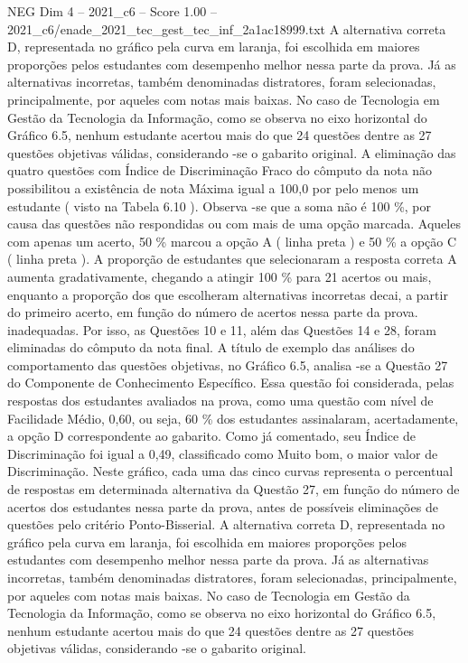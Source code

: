 \begin{textsample}{NEG Dim 4 – 2021\_c6 – Score 1.00 – 2021\_c6/enade\_2021\_tec\_gest\_tec\_inf\_2a1ac18999.txt}
A alternativa correta D, representada no gráfico pela curva em laranja, foi escolhida em maiores proporções pelos estudantes com desempenho melhor nessa parte da prova.
Já as alternativas incorretas, também denominadas distratores, foram selecionadas, principalmente, por aqueles com notas mais baixas.
No caso de Tecnologia em Gestão da Tecnologia da Informação, como se observa no eixo horizontal do Gráfico 6.5, nenhum estudante acertou mais do que 24 questões dentre as 27 questões objetivas válidas, considerando -se o gabarito original.
A eliminação das quatro questões com Índice de Discriminação Fraco do cômputo da nota não possibilitou a existência de nota Máxima igual a 100,0 por pelo menos um estudante ( visto na Tabela 6.10 ).
Observa -se que a soma não é 100 \%, por causa das questões não respondidas ou com mais de uma opção marcada.
Aqueles com apenas um acerto, 50 \% marcou a opção A ( linha preta ) e 50 \% a opção C ( linha preta ).
A proporção de estudantes que selecionaram a resposta correta A aumenta gradativamente, chegando a atingir 100 \% para 21 acertos ou mais, enquanto a proporção dos que escolheram alternativas incorretas decai, a partir do primeiro acerto, em função do número de acertos nessa parte da prova. inadequadas.
Por isso, as Questões 10 e 11, além das Questões 14 e 28, foram eliminadas do cômputo da nota final.
A título de exemplo das análises do comportamento das questões objetivas, no Gráfico 6.5, analisa -se a Questão 27 do Componente de Conhecimento Específico.
Essa questão foi considerada, pelas respostas dos estudantes avaliados na prova, como uma questão com nível de Facilidade Médio, 0,60, ou seja, 60 \% dos estudantes assinalaram, acertadamente, a opção D correspondente ao gabarito.
Como já comentado, seu Índice de Discriminação foi igual a 0,49, classificado como Muito bom, o maior valor de Discriminação.
Neste gráfico, cada uma das cinco curvas representa o percentual de respostas em determinada alternativa da Questão 27, em função do número de acertos dos estudantes nessa parte da prova, antes de possíveis eliminações de questões pelo critério Ponto-Bisserial.
A alternativa correta D, representada no gráfico pela curva em laranja, foi escolhida em maiores proporções pelos estudantes com desempenho melhor nessa parte da prova.
Já as alternativas incorretas, também denominadas distratores, foram selecionadas, principalmente, por aqueles com notas mais baixas.
No caso de Tecnologia em Gestão da Tecnologia da Informação, como se observa no eixo horizontal do Gráfico 6.5, nenhum estudante acertou mais do que 24 questões dentre as 27 questões objetivas válidas, considerando -se o gabarito original.

\end{textsample}
